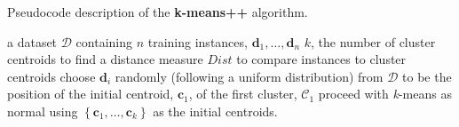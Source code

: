 \documentclass[xcolor={table}]{beamer}
\newcommand{\keyword}[1]{{\textbf{#1}}\index{#1}}
\begin{document}
\begin{frame}[plain]
\scriptsize{Pseudocode description of the \keyword{k-means++} algorithm.}
\begin{footnotesize}
\begin{algorithmic}[1]
\Require a dataset $\mathcal{D}$ containing $n$ training instances, $\mathbf{d}_1, \ldots, \mathbf{d}_n$ 
\Require $k$, the number of cluster centroids to find 
\Require a distance measure ${Dist}$ to compare instances to cluster centroids
\State choose $\mathbf{d}_i$ randomly (following a uniform distribution) from $\mathcal{D}$ to be the position of the initial centroid, ${\mathbf{c}_1}$, of the first cluster, $\mathcal{C}_1$   
\EndFor
\State proceed with \textit{k}-means as normal using $\left\{{\mathbf{c}_1}, \ldots, {\mathbf{c}_k}\right\}$ as the initial centroids.
\end{algorithmic}
\end{footnotesize}
\end{frame}
\end{document}
